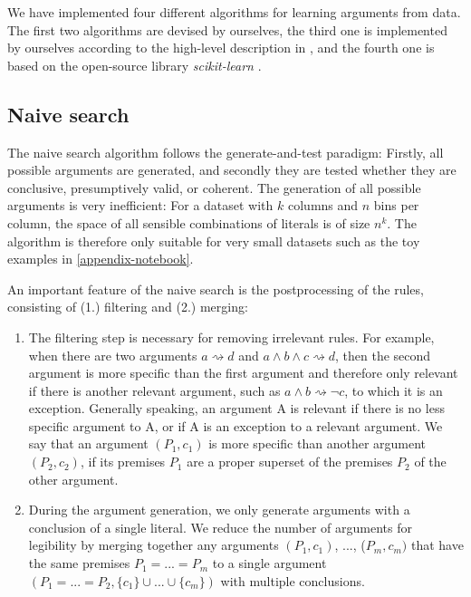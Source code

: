We have implemented four different algorithms for learning arguments from data. The first two algorithms are devised by ourselves, the third one is implemented by ourselves according to the high-level description in \cite{johnstonInductionDefeasibleLogic2003}, and the fourth one is based on the open-source library \textit{scikit-learn} \citep{pedregosa2011scikit}.

\subsection{Naive search}

The naive search algorithm follows the generate-and-test paradigm: Firstly, all possible arguments are generated, and secondly they are tested whether they are conclusive, presumptively valid, or coherent. The generation of all possible arguments is very inefficient: For a dataset with $k$ columns and $n$ bins per column, the space of all sensible combinations of literals is of size $n^k$. The algorithm is therefore only suitable for very small datasets such as the toy examples in \autoref{appendix-notebook}.

An important feature of the naive search is the postprocessing of the rules, consisting of (1.) filtering and (2.) merging:

\begin{enumerate}
    \item The filtering step is necessary for removing irrelevant rules. For example, when there are two arguments $a \rightsquigarrow d$ and $a \land b \land c \rightsquigarrow d$, then the second argument is more specific than the first argument and therefore only relevant if there is another relevant argument, such as $a \land b \rightsquigarrow \neg c$, to which it is an exception. Generally speaking, an argument A is relevant if there is no less specific argument to A, or if A is an exception to a relevant argument. We say that an argument $(P_1, c_1)$ is more specific than another argument $(P_2, c_2)$, if its premises $P_1$ are a proper superset of the premises $P_2$ of the other argument. 
    \item During the argument generation, we only generate arguments with a conclusion of a single literal. We reduce the number of arguments for legibility by merging together any arguments $(P_1, c_1)$, ..., ($P_m, c_m)$ that have the same premises $P_1=...=P_m$ to a single argument $(P_1= ...= P_2, \{c_1\} \cup ... \cup \{c_m\})$ with multiple conclusions.
\end{enumerate}

